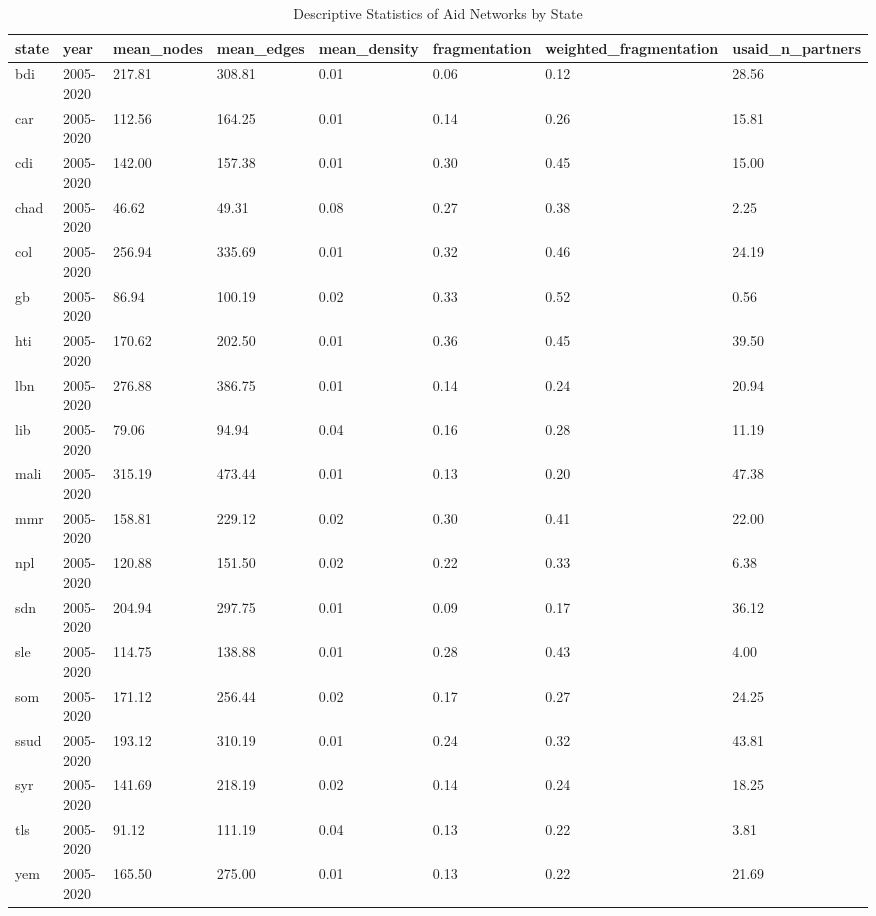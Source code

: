 \begin{table}[!h]
\centering
\caption{\label{tab:tab:aid_network_desc_state}Descriptive Statistics of Aid Networks by State}
\centering
\begin{tabular}[t]{llllllll}
\toprule
state & year & mean\_nodes & mean\_edges & mean\_density & fragmentation & weighted\_fragmentation & usaid\_n\_partners\\
\midrule
bdi & 2005-2020 & 217.81 & 308.81 & 0.01 & 0.06 & 0.12 & 28.56\\
car & 2005-2020 & 112.56 & 164.25 & 0.01 & 0.14 & 0.26 & 15.81\\
cdi & 2005-2020 & 142.00 & 157.38 & 0.01 & 0.30 & 0.45 & 15.00\\
chad & 2005-2020 & 46.62 & 49.31 & 0.08 & 0.27 & 0.38 & 2.25\\
col & 2005-2020 & 256.94 & 335.69 & 0.01 & 0.32 & 0.46 & 24.19\\
\addlinespace
gb & 2005-2020 & 86.94 & 100.19 & 0.02 & 0.33 & 0.52 & 0.56\\
hti & 2005-2020 & 170.62 & 202.50 & 0.01 & 0.36 & 0.45 & 39.50\\
lbn & 2005-2020 & 276.88 & 386.75 & 0.01 & 0.14 & 0.24 & 20.94\\
lib & 2005-2020 & 79.06 & 94.94 & 0.04 & 0.16 & 0.28 & 11.19\\
mali & 2005-2020 & 315.19 & 473.44 & 0.01 & 0.13 & 0.20 & 47.38\\
\addlinespace
mmr & 2005-2020 & 158.81 & 229.12 & 0.02 & 0.30 & 0.41 & 22.00\\
npl & 2005-2020 & 120.88 & 151.50 & 0.02 & 0.22 & 0.33 & 6.38\\
sdn & 2005-2020 & 204.94 & 297.75 & 0.01 & 0.09 & 0.17 & 36.12\\
sle & 2005-2020 & 114.75 & 138.88 & 0.01 & 0.28 & 0.43 & 4.00\\
som & 2005-2020 & 171.12 & 256.44 & 0.02 & 0.17 & 0.27 & 24.25\\
\addlinespace
ssud & 2005-2020 & 193.12 & 310.19 & 0.01 & 0.24 & 0.32 & 43.81\\
syr & 2005-2020 & 141.69 & 218.19 & 0.02 & 0.14 & 0.24 & 18.25\\
tls & 2005-2020 & 91.12 & 111.19 & 0.04 & 0.13 & 0.22 & 3.81\\
yem & 2005-2020 & 165.50 & 275.00 & 0.01 & 0.13 & 0.22 & 21.69\\
\bottomrule
\end{tabular}
\end{table}
